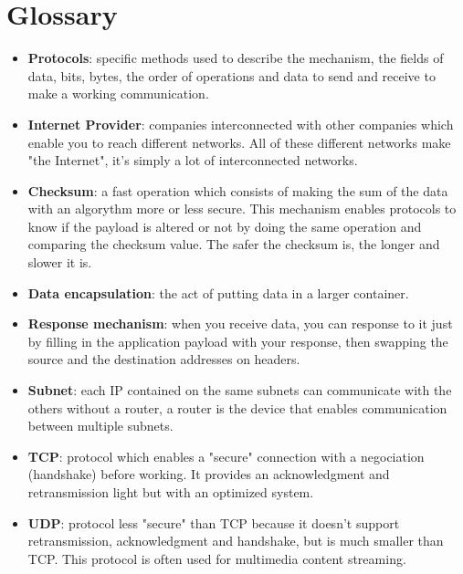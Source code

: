 \documentclass{article}
\begin{document}
	\newpage
	
\section{Glossary}
	
	\begin{itemize}
		\itemsep0em
		\item \textbf{Protocols}:
			specific methods used to describe the mechanism, the fields of data, bits, bytes,
			the order of operations and data to send and receive to make a working communication.
			
		\item \textbf{Internet Provider}: 
			companies interconnected with other companies which enable you to reach different networks.
			All of these different networks make "the Internet", it's simply a lot of interconnected networks.
			
		\item \textbf{Checksum}: 
			a fast operation which consists of making the sum of the data with an algorythm more or less secure.
			This mechanism enables protocols to know if the payload is altered or not by doing the same operation
			and comparing the checksum value. The safer the checksum is, the longer and slower it is.
			
		\item \textbf{Data encapsulation}: 
			the act of putting data in a larger container.
			
		\item \textbf{Response mechanism}: 
			when you receive data, you can response to it just by filling in the application payload
			with your response, then swapping the source and the destination addresses on headers.
			
		\item \textbf{Subnet}: 
			each IP contained on the same subnets can communicate with the others without a router, a router
			is the device that enables communication between multiple subnets.
			
		\item \textbf{TCP}: 
			protocol which enables a "secure" connection with a negociation (handshake) before working. It provides
			an acknowledgment and retransmission light but with an optimized system.
			
		\item \textbf{UDP}: 
			protocol less "secure" than TCP because it doesn't support retransmission, acknowledgment and handshake,
			but is much smaller than TCP. This protocol is often used for multimedia content streaming.
			

\end{itemize}
\end{document}
